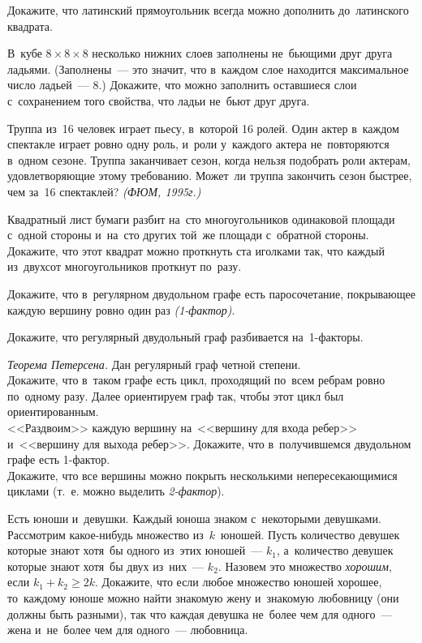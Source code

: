 \begin{problems}

\item
Докажите, что латинский прямоугольник всегда можно дополнить до~латинского
квадрата.

\item
В~кубе $8 \times 8 \times 8$ несколько нижних слоев заполнены не~бьющими друг
друга ладьями.
(Заполнены~--- это значит, что в~каждом слое находится максимальное число
ладьей~--- 8.)
Докажите, что можно заполнить оставшиеся слои с~сохранением того свойства, что
ладьи не~бьют друг друга.

\item
Труппа из~16 человек играет пьесу, в~которой 16 ролей.
Один актер в~каждом спектакле играет ровно одну роль, и~роли у~каждого актера
не~повторяются в~одном сезоне.
Труппа заканчивает сезон, когда нельзя подобрать роли актерам, удовлетворяющие
этому требованию.
Может~ли труппа закончить сезон быстрее, чем за~16 спектаклей?
\emph{(ФЮМ, 1995г.)}

\item
Квадратный лист бумаги разбит на~сто многоугольников одинаковой площади с~одной
стороны и~на~сто других той~же площади с~обратной стороны.
Докажите, что этот квадрат можно проткнуть ста иголками так, что каждый
из~двухсот многоугольников проткнут по~разу.

\item
Докажите, что в~регулярном двудольном графе есть паросочетание, покрывающее
каждую вершину ровно один раз \emph{(1-фактор)}.

\item
Докажите, что регулярный двудольный граф разбивается на~1-факторы.

\item\emph{Теорема Петерсена.}
Дан регулярный граф четной степени.
\\
\subproblem
Докажите, что в~таком графе есть цикл, проходящий по~всем ребрам ровно
по~одному разу.
Далее ориентируем граф так, чтобы этот цикл был ориентированным.
\\
\subproblem
<<Раздвоим>> каждую вершину на~<<вершину для входа ребер>>
и~<<вершину для выхода ребер>>.
Докажите, что в~получившемся двудольном графе есть 1-фактор.
\\
\subproblem
Докажите, что все вершины можно покрыть несколькими непересекающимися циклами
(т.~е. можно выделить \emph{2-фактор}).

\item
Есть юноши и~девушки.
Каждый юноша знаком с~некоторыми девушками.
Рассмотрим какое-нибудь множество из~$k$~юношей.
Пусть количество девушек которые знают хотя~бы одного из~этих юношей~---
$k_1$, а~количество девушек которые знают хотя~бы двух из~них~--- $k_2$.
Назовем это множество \emph{хорошим}, если $k_1 + k_2 \geq 2 k$.
Докажите, что если любое множество юношей хорошее, то~каждому юноше можно найти
знакомую жену и~знакомую любовницу (они должны быть разными), так что каждая
девушка не~более чем для одного~--- жена и~не~более чем для одного~---
любовница.


\end{problems}
